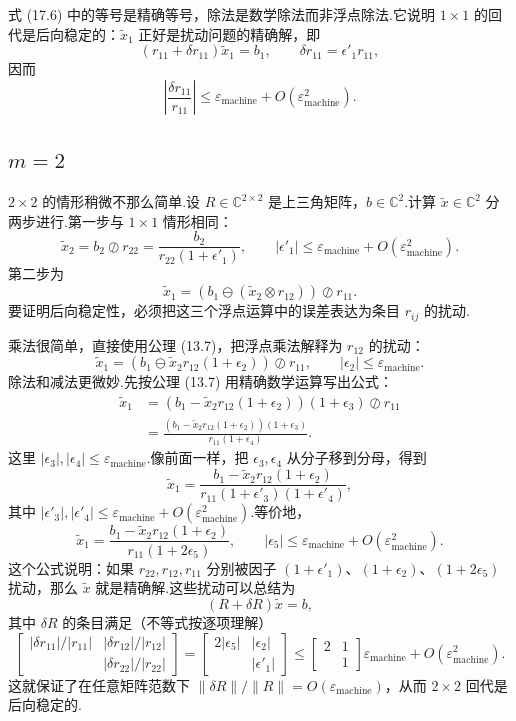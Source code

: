 \documentclass[UTF8,fontset=none,12pt]{ctexart}
\newcommand{\C}{\mathbb{C}}
\newcommand{\epsmach}{\varepsilon_{\mathrm{machine}}}
\theoremstyle{definition}
\begin{document}
式 (17.6) 中的等号是精确等号，除法是数学除法而非浮点除法.它说明 $1\times1$ 的回代是后向稳定的：$\widetilde x_1$ 正好是扰动问题的精确解，即
\[
(r_{11}+\delta r_{11})\widetilde x_1=b_1,
\qquad \delta r_{11}=\epsilon'_1r_{11},
\]
因而
\[
\left|\frac{\delta r_{11}}{r_{11}}\right|
\le\epsmach+O(\epsmach^2).
\]

\subsection*{$m=2$}

$2\times2$ 的情形稍微不那么简单.设 $R\in\C^{2\times2}$ 是上三角矩阵，$b\in\C^2$.计算 $\widetilde x\in\C^2$ 分两步进行.第一步与 $1\times1$ 情形相同：
\begin{equation}
    \widetilde x_2=b_2\oslash r_{22}
    =\frac{b_2}{r_{22}(1+\epsilon'_1)},
    \qquad |\epsilon'_1|\le\epsmach+O(\epsmach^2).
    \tag{17.7}
\end{equation}
第二步为
\[
\widetilde x_1=(b_1\ominus(\widetilde x_2\otimes r_{12}))\oslash r_{11}.
\]
要证明后向稳定性，必须把这三个浮点运算中的误差表达为条目 $r_{ij}$ 的扰动.

乘法很简单，直接使用公理 (13.7)，把浮点乘法解释为 $r_{12}$ 的扰动：
\[
\widetilde x_1=(b_1\ominus\widetilde x_2r_{12}(1+\epsilon_2))\oslash r_{11},
\qquad |\epsilon_2|\le\epsmach.
\]
除法和减法更微妙.先按公理 (13.7) 用精确数学运算写出公式：
\begin{align}
\widetilde x_1
&=(b_1-\widetilde x_2r_{12}(1+\epsilon_2))(1+\epsilon_3)\oslash r_{11}
\tag{17.8}\\
&=\frac{(b_1-\widetilde x_2r_{12}(1+\epsilon_2))(1+\epsilon_3)}{r_{11}(1+\epsilon_4)}.
\tag{17.9}
\end{align}
这里 $|\epsilon_3|,|\epsilon_4|\le\epsmach$.像前面一样，把 $\epsilon_3,\epsilon_4$ 从分子移到分母，得到
\[
\widetilde x_1
=\frac{b_1-\widetilde x_2r_{12}(1+\epsilon_2)}{r_{11}(1+\epsilon'_3)(1+\epsilon'_4)},
\]
其中 $|\epsilon'_3|,|\epsilon'_4|\le\epsmach+O(\epsmach^2)$.等价地，
\begin{equation}
    \widetilde x_1
    =\frac{b_1-\widetilde x_2r_{12}(1+\epsilon_2)}{r_{11}(1+2\epsilon_5)},
    \qquad |\epsilon_5|\le\epsmach+O(\epsmach^2).
    \tag{17.10}
\end{equation}
这个公式说明：如果 $r_{22},r_{12},r_{11}$ 分别被因子 $(1+\epsilon'_1)$、$(1+\epsilon_2)$、$(1+2\epsilon_5)$ 扰动，那么 $\widetilde x$ 就是精确解.这些扰动可以总结为
\[
(R+\delta R)\widetilde x=b,
\]
其中 $\delta R$ 的条目满足（不等式按逐项理解）
\[
\begin{bmatrix}
|\delta r_{11}|/|r_{11}|&|\delta r_{12}|/|r_{12}|\\
&|\delta r_{22}|/|r_{22}|
\end{bmatrix}
=\begin{bmatrix}2|\epsilon_5|&|\epsilon_2|\\&|\epsilon'_1|\end{bmatrix}
\le
\begin{bmatrix}2&1\\&1\end{bmatrix}\epsmach+O(\epsmach^2).
\]
这就保证了在任意矩阵范数下 $\|\delta R\|/\|R\|=O(\epsmach)$，从而 $2\times2$ 回代是后向稳定的.
\end{document}
